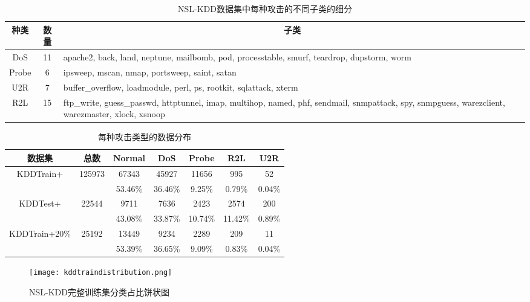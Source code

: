 \begin{table}[htbp]
  \caption{NSL-KDD数据集中每种攻击的不同子类的细分}
  \label{tab:attack_class}
  \begin{tabularx}{\textwidth}{@{}ccX@{}}
  \toprule
    \multicolumn{1}{c}{\textbf{种类}} & \multicolumn{1}{c}{\textbf{数量}} & \multicolumn{1}{c}{\textbf{子类}}\\
  \midrule
    DoS & 11 & apache2, back, land, neptune, mailbomb, pod, processtable, smurf, teardrop, dupstorm, worm\\
    Probe & 6 & ipsweep, mscan, nmap, portsweep, saint, satan\\
    U2R & 7 & buffer\_overflow, loadmodule, perl, ps, rootkit, sqlattack, xterm\\
    R2L & 15 & ftp\_write, guess\_passwd, httptunnel, imap, multihop, named, phf, sendmail, snmpattack, spy, snmpguess, warezclient, warezmaster, xlock, xsnoop\\
  \bottomrule
  \end{tabularx}
\end{table}

\begin{table}[htbp]
  \caption{每种攻击类型的数据分布}
  \label{tab:kdd_distribution}
  \centering
  \begin{tabular}{ccccccc}
  \toprule
  \textbf{数据集} & \textbf{总数} & \textbf{Normal} & \textbf{DoS} & \textbf{Probe} & \textbf{R2L} & \textbf{U2R}\\
  \midrule
  \multirow{2}{*}{KDDTrain+} & \multirow{2}{*}{125973} & 67343 & 45927 & 11656 & 995  & 52   \\
                             &                          &53.46\%& 36.46\% & 9.25\%&0.79\%&0.04\%\\
  \multirow{2}{*}{KDDTest+} & \multirow{2}{*}{22544} & 9711 & 7636 & 2423 & 2574 & 200\\
                            &                           & 43.08\% & 33.87\%& 10.74\%& 11.42\%&0.89\%\\
  \multirow{2}{*}{KDDTrain+20\%} & \multirow{2}{*}{25192} & 13449 & 9234 & 2289 & 209 & 11\\
                                 &                      & 53.39\% & 36.65\%& 9.09\%& 0.83\%&0.04\%\\
  \bottomrule
  \end{tabular}
\end{table}

  \begin{figure}[htbp]
    \centering
    \texttt{[image: kddtraindistribution.png]}
    \caption{NSL-KDD完整训练集分类占比饼状图}
    \label{fig:kddtraindistribution}
  \end{figure}

